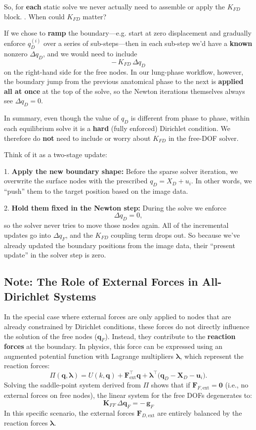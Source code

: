 \documentclass{article}
\begin{document}
   So, for \textbf{each} static solve we never actually need to assemble or apply the $K_{FD}$ block.
. When could $K_{FD}$ matter?

If we chose to \textbf{ramp} the boundary—e.g. start at zero displacement and gradually enforce $q_D^{(i)}$ 
over a series of sub-steps—then in each sub-step we’d have a \textbf{known} nonzero $\Delta q_D$, and we would need to include
$$-\,K_{FD}\,\Delta q_D$$
on the right-hand side for the free nodes.
In our lung-phase workflow, however, the boundary jump from the previous anatomical phase to the next is 
\textbf{applied all at once} at the top of the solve, so the Newton iterations themselves always see $\Delta q_D=0$.

In summary, even though the value of $q_D$ is different from phase to phase, 
within each equilibrium solve it is a \textbf{hard} (fully enforced) Dirichlet condition.
We therefore do \textbf{not} need to include or worry about $K_{FD}$ in the free-DOF solver.

Think of it as a two-stage update:

1. \textbf{Apply the new boundary shape: }
Before the sparse solver iteration, we overwrite the surface nodes with the prescribed $q_D = X_D + u_i$.
In other words, we “push” them to the target position based on the image data.

2. \textbf{Hold them fixed in the Newton step: } During the solve we enforce
$$\Delta q_D = 0,$$    
so the solver never tries to move those nodes again. 
All of the incremental updates go into $\Delta q_F$, and the $K_{FD}$ coupling term drops out.
So because we’ve already updated the boundary positions from the image data, their “present update” in the solver step is zero.

\subsection{Note: The Role of External Forces in All-Dirichlet Systems}
In the special case where external forces are only applied to nodes that are already constrained by Dirichlet conditions, these forces do not directly influence the solution of the free nodes ($\mathbf{q}_F$). Instead, they contribute to the \textbf{reaction forces} at the boundary.
\newline
In physics, this force can be expressed using an augmented potential function with Lagrange multipliers $\boldsymbol\lambda$, which represent the reaction forces:
\[
    \Pi(\mathbf{q},\boldsymbol\lambda) = U(k, \mathbf{q}) + \mathbf{F}_{\text{ext}}^{\!\top}\mathbf{q} + \boldsymbol\lambda^{\!\top} \bigl(\mathbf{q}_D - \mathbf{X}_D - \mathbf{u}_i\bigr).
\]
Solving the saddle-point system derived from $\Pi$ shows that if $\mathbf{F}_{F,\text{ext}} = \mathbf{0}$ (i.e., no external forces on free nodes), the linear system for the free DOFs degenerates to:
\[
    \boxed{ \mathbf{K}_{FF}\,\Delta\mathbf{q}_F = -\,\mathbf{g}_F }
\]
In this specific scenario, the external forces $\mathbf{F}_{D,\text{ext}}$ are entirely balanced by the reaction forces $\boldsymbol{\lambda}$.
\end{document}
